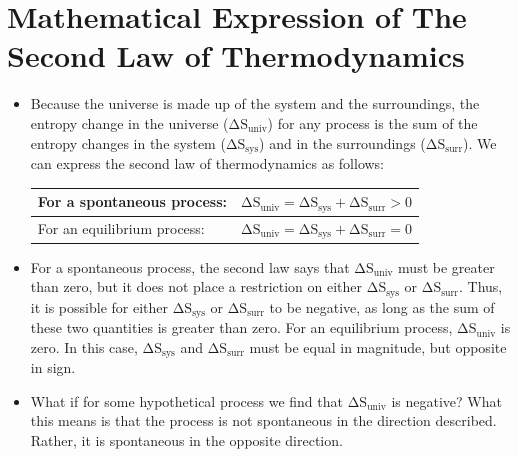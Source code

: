 \documentclass[a4paper,12pt,twocolumn]{article}
\begin{document}
\section{Mathematical Expression of The Second Law of Thermodynamics}
\begin{itemize}
\item Because the universe is made up of the system and the surroundings, the entropy change in the universe ($\mathrm{\Delta S_{univ}}$) for any process is the sum of the entropy changes in the system ($\mathrm{\Delta S_{sys}}$) and in the surroundings ($\mathrm{\Delta S_{surr}}$). We can express the second law of thermodynamics as follows:
\begin{table}[h]
\centering
\def\arraystretch{1.5}
\begin{tabular}{|p{1.2in}|l|}
\hline
For a spontaneous process: & $\mathrm{\Delta S_{univ} = \Delta S_{sys} + \Delta S_{surr} > 0}$ \\ \hline
For an equilibrium process: & $\mathrm{\Delta S_{univ} = \Delta S_{sys} + \Delta S_{surr} = 0}$ \\ \hline
\end{tabular}
\end{table}
\item For a spontaneous process, the second law says that $\mathrm{\Delta S_{univ}}$ must be greater than zero, but it does not place a restriction on either $\mathrm{\Delta S_{sys}}$ or $\mathrm{\Delta S_{surr}}$. Thus, it is possible for either $\mathrm{\Delta S_{sys}}$ or $\mathrm{\Delta S_{surr}}$ to be negative, as long as the sum of these two quantities is greater than zero. For an equilibrium process, $\mathrm{\Delta S_{univ}}$ is zero. In this case, $\mathrm{\Delta S_{sys}}$ and $\mathrm{\Delta S_{surr}}$ must be equal in magnitude, but opposite in sign. 
\item What if for some hypothetical process we find that $\mathrm{\Delta S_{univ}}$ is negative? What this means is that the process is not spontaneous in the direction described. Rather, it is spontaneous in the opposite direction.
\end{itemize}
\end{document}
